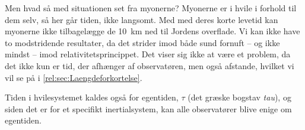 Men hvad så med situationen set fra myonerne?
Myonerne er i hvile i forhold til dem selv, så her går tiden, ikke langsomt.
Med med deres korte levetid kan myonerne ikke tilbagelægge de \SI{10}{\kilo\metre} ned til Jordens overflade.
Vi kan ikke have to modstridende resultater, da det strider imod både sund fornuft -- og ikke mindst -- imod relativitetsprincippet.
Det viser sig ikke at være et problem, da det ikke kun er tid, der afhænger af observatøren, men også afstande, hvilket vi vil se på i \cref{rel:sec:Laengdeforkortelse}.

Tiden i hvilesystemet kaldes også for egentiden, $\tau$ (det græske bogstav \emph{tau}), og siden det er for et specifikt inertialsystem, kan alle observatører blive enige om egentiden. 
